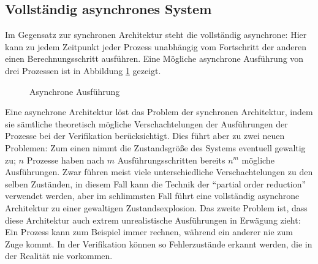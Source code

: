 \subsection{Vollständig asynchrones System}
Im Gegensatz zur synchronen Architektur steht die vollständig asynchrone: 
Hier kann zu jedem Zeitpunkt jeder Prozess unabhängig vom Fortschritt der anderen einen Berechnungsschritt ausführen.
Eine Mögliche asynchrone Ausführung von drei Prozessen ist in Abbildung \ref{fig:asynchronous_execution} gezeigt.
\begin{figure}[h]
  \centering
  \caption{Asynchrone Ausführung}
  \label{fig:asynchronous_execution}
\end{figure}

Eine asynchrone Architektur löst das Problem der synchronen Architektur, indem sie sämtliche theoretisch mögliche Verschachtelungen der Ausführungen der Prozesse bei der Verifikation berücksichtigt.
Dies führt aber zu zwei neuen Problemen:
Zum einen nimmt die Zustandsgröße des Systems eventuell gewaltig zu; $n$ Prozesse haben nach $m$ Ausführungsschritten bereits $n^m$ mögliche Ausführungen.
Zwar führen meist viele unterschiedliche Verschachtelungen zu den selben Zuständen, in diesem Fall kann die Technik der "`partial order reduction"'\cite{partial_order_reduction} verwendet werden, aber im schlimmsten Fall führt eine vollständig asynchrone Architektur zu einer gewaltigen Zustandsexplosion.
Das zweite Problem ist, dass diese Architektur auch extrem unrealistische Ausführungen in Erwägung zieht:
Ein Prozess kann zum Beispiel immer rechnen, während ein anderer nie zum Zuge kommt.
In der Verifikation können so Fehlerzustände erkannt werden, die in der Realität nie vorkommen.

